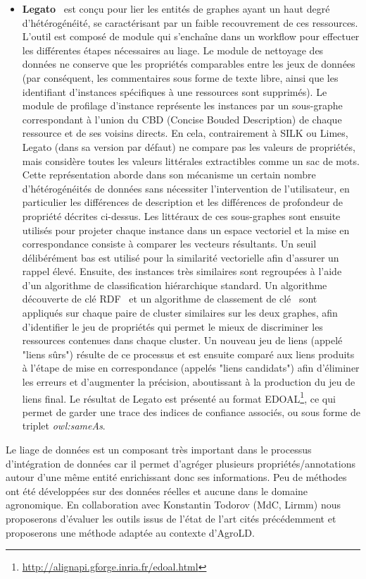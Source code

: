 \begin{itemize}
\item \textbf{Legato}~\cite{AchichiBT17} est conçu pour lier les entités de graphes ayant un haut degré d'hétérogénéité, se caractérisant par un faible recouvrement de ces ressources. L'outil est composé de module qui s'enchaîne dans un workflow pour effectuer les différentes étapes nécessaires au liage. Le module de nettoyage des données ne conserve que les propriétés comparables entre les jeux de données (par conséquent, les commentaires sous forme de texte libre, ainsi que les identifiant d'instances spécifiques à une ressources sont supprimés). Le module de profilage d'instance représente les instances par un sous-graphe correspondant à l'union du CBD (Concise Bouded Description) de chaque ressource et de ses voisins directs. En cela, contrairement à SILK ou Limes, Legato (dans sa version par défaut) ne compare pas les valeurs de propriétés, mais considère toutes les valeurs littérales extractibles comme un sac de mots. Cette représentation aborde dans son mécanisme un certain nombre d'hétérogénéités de données sans nécessiter l'intervention de l'utilisateur, en particulier les différences de description et les différences de profondeur de propriété décrites ci-dessus. Les littéraux de ces sous-graphes sont ensuite utilisés pour projeter chaque instance dans un espace vectoriel et la mise en correspondance consiste à comparer les vecteurs résultants. Un seuil délibérément bas est utilisé pour la similarité vectorielle afin d'assurer un rappel élevé. Ensuite, des instances très similaires sont regroupées à l'aide d'un algorithme de classification hiérarchique standard. Un algorithme découverte de clé RDF~\cite{SymeonidouAPS14} et un algorithme de classement de clé~\cite{Achichi2016} sont appliqués sur chaque paire de cluster similaires sur les deux graphes, afin d'identifier le jeu de propriétés qui permet le mieux de discriminer les ressources contenues dans chaque cluster. Un nouveau jeu de liens (appelé "liens sûrs") résulte de ce processus et est ensuite comparé aux liens produits à l'étape de mise en correspondance (appelés "liens candidats") afin d'éliminer les erreurs et d'augmenter la précision, aboutissant à la production du jeu de liens final. Le résultat de Legato est présenté au format EDOAL\footnote{\url{http://alignapi.gforge.inria.fr/edoal.html}}, ce qui permet de garder une trace des indices de confiance associés, ou sous forme de triplet \textit{owl:sameAs}. \\
\end{itemize}

Le liage de données est un composant très important dans le processus d’intégration de données car il permet d’agréger plusieurs propriétés/annotations autour d’une même entité enrichissant donc ses informations. Peu de méthodes ont été développées sur des données réelles et aucune dans le domaine agronomique. En collaboration avec Konstantin Todorov (MdC, Lirmm) nous proposerons d'évaluer les outils issus de l'état de l'art cités précédemment et proposerons une méthode adaptée au contexte d’AgroLD. \\


